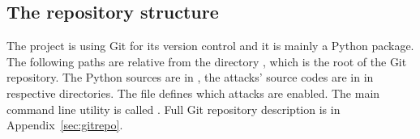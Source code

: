 \subsection{The repository structure}
The project is using Git for its version control and it is mainly a Python package. The following paths are relative from the directory \projectroot, which is the root of the Git repository. The Python sources are in , the attacks' source codes are in  in respective directories. The file  defines which attacks are enabled. The main command line utility is called \javus. Full Git repository description is in Appendix~\ref{sec:gitrepo}.
